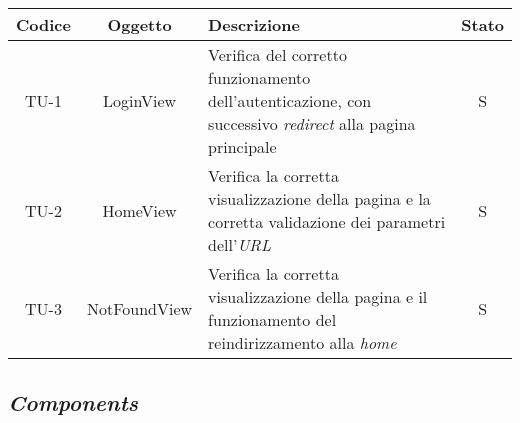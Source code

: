\begin{center}
  \label{tab:test-unita-views}
  \begin{longtable}{|c|c|p{}|c|}
  \hline
  \textbf{Codice} & \textbf{Oggetto} & \textbf{Descrizione} & \textbf{Stato}\\
  \hline
  TU-1 &LoginView &Verifica del corretto funzionamento dell'autenticazione, con successivo \textit{redirect} alla pagina principale &S \\
  \hline
  TU-2 &HomeView &Verifica la corretta visualizzazione della pagina e la corretta validazione dei parametri dell'\textit{URL} &S \\
  \hline
  TU-3 &NotFoundView &Verifica la corretta visualizzazione della pagina e il funzionamento del reindirizzamento alla \textit{home} &S \\
  \hline
\end{longtable}
\end{center}

\subsection*{\emph{Components}}\label{subsec:test-unita-components}

